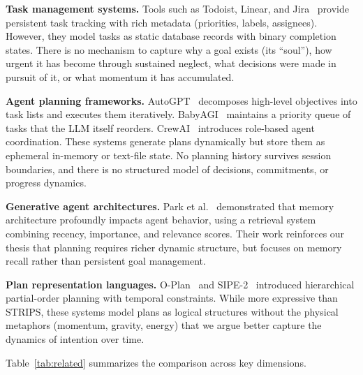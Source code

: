 \documentclass[10pt, twocolumn]{article}
\begin{document}
\textbf{Task management systems.} Tools such as Todoist, Linear, and Jira~\cite{jira_2024} provide persistent task tracking with rich metadata (priorities, labels, assignees). However, they model tasks as static database records with binary completion states. There is no mechanism to capture why a goal exists (its ``soul''), how urgent it has become through sustained neglect, what decisions were made in pursuit of it, or what momentum it has accumulated.

\textbf{Agent planning frameworks.} AutoGPT~\cite{autogpt_2024} decomposes high-level objectives into task lists and executes them iteratively. BabyAGI~\cite{babyagi_2024} maintains a priority queue of tasks that the LLM itself reorders. CrewAI~\cite{crewai_2024} introduces role-based agent coordination. These systems generate plans dynamically but store them as ephemeral in-memory or text-file state. No planning history survives session boundaries, and there is no structured model of decisions, commitments, or progress dynamics.

\textbf{Generative agent architectures.} Park et al.~\cite{park2023generative} demonstrated that memory architecture profoundly impacts agent behavior, using a retrieval system combining recency, importance, and relevance scores. Their work reinforces our thesis that planning requires richer dynamic structure, but focuses on memory recall rather than persistent goal management.

\textbf{Plan representation languages.} O-Plan~\cite{currie1991oplan} and SIPE-2~\cite{wilkins1988sipe} introduced hierarchical partial-order planning with temporal constraints. While more expressive than STRIPS, these systems model plans as logical structures without the physical metaphors (momentum, gravity, energy) that we argue better capture the dynamics of intention over time.

Table~\ref{tab:related} summarizes the comparison across key dimensions.
\end{document}
